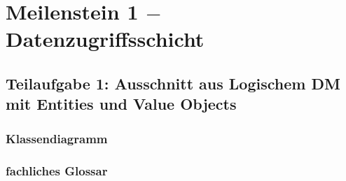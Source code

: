 \section{Meilenstein 1 $-$ Datenzugriffsschicht}

\subsection{Teilaufgabe 1: Ausschnitt aus Logischem DM mit Entities und Value Objects}

\subsubsection{Klassendiagramm}


\subsubsection{fachliches Glossar}

